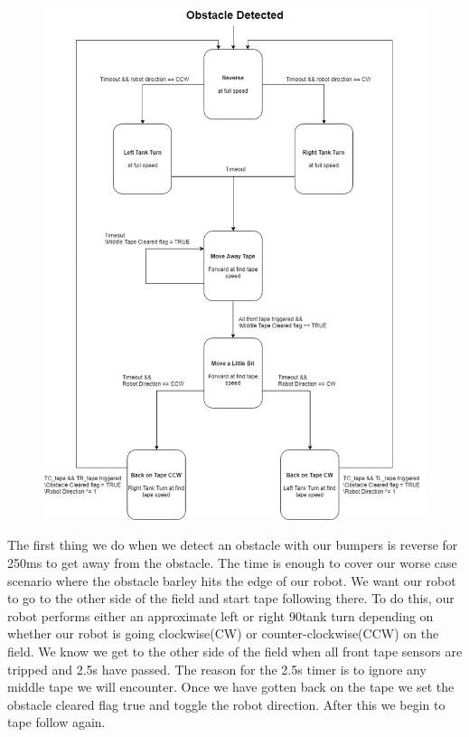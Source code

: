 \documentclass{article}
\begin{document}
\begin{figure}[H]
    \centering
    \includegraphics[scale = 0.5]{ObstacleDetected.png}
\end{figure}

The first thing we do when we detect an obstacle with our bumpers is reverse for 250ms to get away from the obstacle.  The time is enough to cover our worse case scenario where the obstacle barley hits the edge of our robot.  We want our robot to go to the other side of the field and start tape following there.  To do this, our robot performs either an approximate left or right 90\degree tank turn depending on whether our robot is going clockwise(CW) or counter-clockwise(CCW) on the field.  We know we get to the other side of the field when all front tape sensors are tripped and 2.5s have passed.  The reason for the 2.5s timer is to ignore any middle tape we will encounter.  Once we have gotten back on the tape we set the obstacle cleared flag true and toggle the robot direction.  After this we begin to tape follow again.
\end{document}

